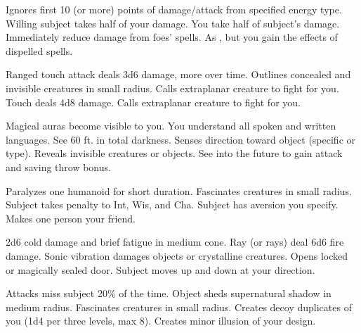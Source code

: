 \begin{swspelllist}
 Ignores first 10 (or more) points of damage/attack from specified energy type.
 Willing subject takes half of your damage.
 You take half of subject's damage.
 Immediately reduce damage from foes' spells.
 As , but you gain the effects of dispelled spells.

 Ranged touch attack deals 3d6 damage, more over time.
 Outlines concealed and invisible creatures in small radius.
 Calls extraplanar creature to fight for you.
 Touch deals 4d8 damage.
 Calls extraplanar creature to fight for you.

 Magical auras become visible to you.
 You understand all spoken and written languages.
 See 60 ft. in total darkness.
 Senses direction toward object (specific or type).
 Reveals invisible creatures or objects.
\spellheadrestricted{}
 See into the future to gain attack and saving throw bonus.

 Paralyzes one humanoid for short duration.
 Fascinates creatures in small radius.
 Subject takes  penalty to Int, Wis, and Cha.
 Subject has aversion you specify.
 Makes one person your friend.

 2d6 cold damage and brief fatigue in medium cone.
 Ray (or rays) deal 6d6 fire damage.
 Sonic vibration damages objects or crystalline creatures.
 Opens locked or magically sealed door.
 Subject moves up and down at your direction.

 Attacks miss subject 20\% of the time.
 Object sheds supernatural shadow in medium radius.
 Fascinates creatures in small radius.
 Creates decoy duplicates of you (1d4  per three levels, max 8).
 Creates minor illusion of your design.


\end{swspelllist}
